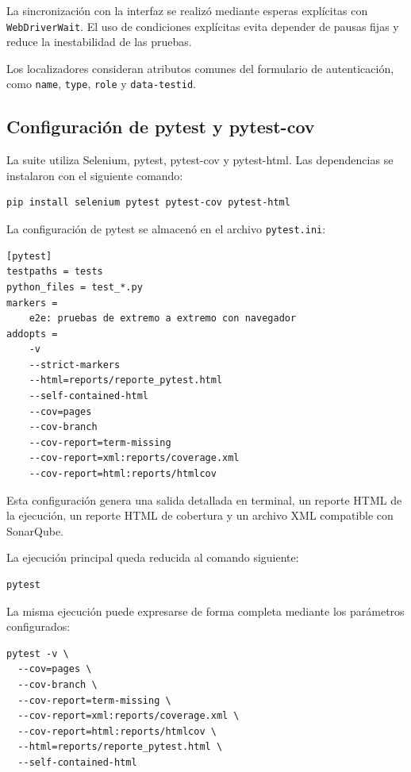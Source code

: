 \documentclass{article}
\begin{document}
La sincronización con la interfaz se realizó mediante esperas explícitas con \texttt{WebDriverWait}. El uso de condiciones explícitas evita depender de pausas fijas y reduce la inestabilidad de las pruebas.

Los localizadores consideran atributos comunes del formulario de autenticación, como \texttt{name}, \texttt{type}, \texttt{role} y \texttt{data-testid}.

\subsection{Configuración de pytest y pytest-cov}

La suite utiliza Selenium, pytest, pytest-cov y pytest-html. Las dependencias se instalaron con el siguiente comando:

\begin{lstlisting}[caption={Instalación de dependencias para la suite}]
pip install selenium pytest pytest-cov pytest-html
\end{lstlisting}

La configuración de pytest se almacenó en el archivo \texttt{pytest.ini}:

\begin{lstlisting}[caption={Configuración del archivo \texttt{pytest.ini}}]
[pytest]
testpaths = tests
python_files = test_*.py
markers =
    e2e: pruebas de extremo a extremo con navegador
addopts =
    -v
    --strict-markers
    --html=reports/reporte_pytest.html
    --self-contained-html
    --cov=pages
    --cov-branch
    --cov-report=term-missing
    --cov-report=xml:reports/coverage.xml
    --cov-report=html:reports/htmlcov
\end{lstlisting}

Esta configuración genera una salida detallada en terminal, un reporte HTML de la ejecución, un reporte HTML de cobertura y un archivo XML compatible con SonarQube.

La ejecución principal queda reducida al comando siguiente:

\begin{lstlisting}[caption={Ejecución mediante la configuración de \texttt{pytest.ini}}]
pytest
\end{lstlisting}

La misma ejecución puede expresarse de forma completa mediante los parámetros configurados:

\begin{lstlisting}[caption={Ejecución de pruebas y generación de reportes}]
pytest -v \
  --cov=pages \
  --cov-branch \
  --cov-report=term-missing \
  --cov-report=xml:reports/coverage.xml \
  --cov-report=html:reports/htmlcov \
  --html=reports/reporte_pytest.html \
  --self-contained-html
\end{lstlisting}
\end{document}
